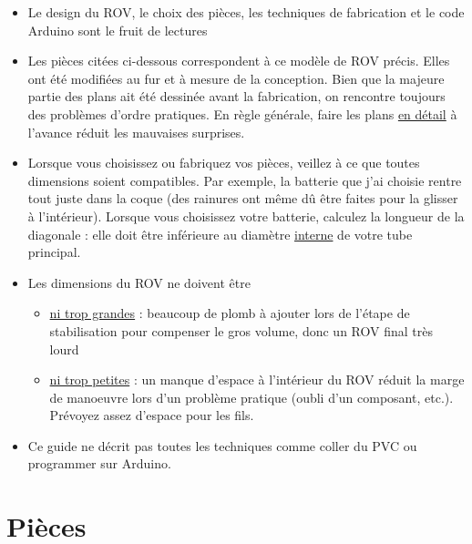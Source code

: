 \documentclass[11pt,a4paper]{article}
\begin{document}
    \begin{itemize}
      \item Le design du ROV, le choix des pièces, les techniques de fabrication et le code Arduino sont le fruit de lectures 

      \item Les pièces citées ci-dessous correspondent à ce modèle de ROV précis. Elles ont été modifiées au fur et à mesure de la conception. Bien que la majeure partie des plans ait été dessinée avant la fabrication, on rencontre toujours des problèmes d'ordre pratiques. En règle générale, faire les plans \underline{en détail} à l'avance réduit les mauvaises surprises.

      \item Lorsque vous choisissez ou fabriquez vos pièces, veillez à ce que toutes dimensions soient compatibles. Par exemple, la batterie que j'ai choisie rentre tout juste dans la coque (des rainures ont même dû être faites pour la glisser à l'intérieur). Lorsque vous choisissez votre batterie, calculez la longueur de la diagonale : elle doit être inférieure au diamètre \underline{interne} de votre tube principal.
      
      \item Les dimensions du ROV ne doivent être 
      \begin{itemize}
        \item \underline{ni trop grandes} : beaucoup de plomb à ajouter lors de l'étape de stabilisation pour compenser le gros volume, donc un ROV final très lourd
        \item \underline{ni trop petites} : un manque d'espace à l'intérieur du ROV réduit la marge de manoeuvre lors d'un problème pratique (oubli d'un composant, etc.). Prévoyez assez d'espace pour les fils.
      \end{itemize}
      
      \item Ce guide ne décrit pas toutes les techniques comme coller du PVC ou programmer sur Arduino.
      
    \end{itemize}

  \section{Pièces}

  
\end{document}
